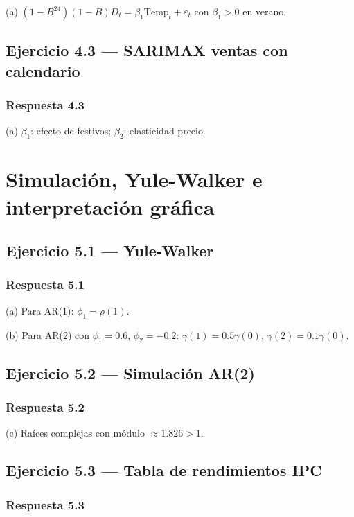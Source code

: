 \documentclass[12pt, letterpaper]{article}
\begin{document}
(a) $(1-B^{24})(1-B)D_t = \beta_1 \text{Temp}_t + \varepsilon_t$ con $\beta_1>0$ en verano.

\subsection{Ejercicio 4.3 — SARIMAX ventas con calendario}

\subsubsection*{Respuesta 4.3}

(a) $\beta_1$: efecto de festivos; $\beta_2$: elasticidad precio.

\newpage
\section{Simulación, Yule-Walker e interpretación gráfica}

\subsection{Ejercicio 5.1 — Yule-Walker}

\subsubsection*{Respuesta 5.1}

(a) Para AR(1): $\phi_1 = \rho(1)$.

(b) Para AR(2) con $\phi_1=0.6$, $\phi_2=-0.2$: $\gamma(1)=0.5\gamma(0)$, $\gamma(2)=0.1\gamma(0)$.

\subsection{Ejercicio 5.2 — Simulación AR(2)}

\subsubsection*{Respuesta 5.2}

(c) Raíces complejas con módulo $\approx 1.826 > 1$.

\subsection{Ejercicio 5.3 — Tabla de rendimientos IPC}

\subsubsection*{Respuesta 5.3}
\end{document}

